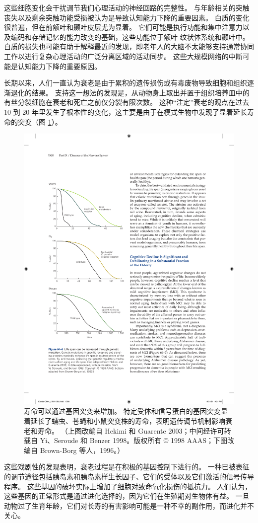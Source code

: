 这些细胞变化会干扰调节我们心理活动的神经回路的完整性。
与年龄相关的突触丧失以及剩余突触功能受损被认为是导致认知能力下降的重要因素。
白质的变化很普遍，但在前额叶和颞叶皮层尤为显着。
它们可能是执行功能和集中注意力以及编码和存储记忆的能力改变的基础，这些功能位于额叶-纹状体系统和颞叶中。
白质的损失也可能有助于解释最近的发现，即老年人的大脑不太能够支持通常协同工作以进行复杂心理活动的广泛分离区域的活动同步。
这些大规模网络的中断可能是认知能力下降的重要原因。


长期以来，人们一直认为衰老是由于累积的遗传损伤或有毒废物导致细胞和组织逐渐退化的结果。
支持这一想法的发现是，从动物身上取出并置于组织培养皿中的有丝分裂细胞在衰老和死亡之前仅分裂有限次数。
这种“注定”衰老的观点在过去 10 到 20 年里发生了根本性的变化，这主要是由于在模式生物中发现了显着延长寿命的突变（图 \ref{fig:64_6}）。


\begin{figure}[htbp]
	\centering
	\includegraphics[width=0.5\linewidth]{chap64/fig_64_6}
	\caption{寿命可以通过基因突变来增加。 特定受体和信号蛋白的基因突变显着延长了蠕虫、苍蝇和小鼠突变株的寿命，表明遗传调节机制影响衰老和寿命。 （上图改编自 Hekimi 和 Guarente 2003；中间经许可转载自 Yi、Seroude 和 Benzer 1998。版权所有 © 1998 AAAS；下图改编自 Brown-Borg 等人，1996。）}
	\label{fig:64_6}
\end{figure}


这些戏剧性的发现表明，衰老过程是在积极的基因控制下进行的。
一种已被表征的调节途径包括胰岛素和胰岛素样生长因子、它们的受体以及它们激活的信号传导程序。
这些基因的破坏实际上增加了细胞对致命氧化损伤的抵抗力。
人们认为，这些基因的正常形式是通过进化选择的，因为它们在生殖期对生物体有益。
一旦动物过了生育年龄，它们对长寿的有害影响可能是一种不幸的副作用，而进化并不关心。



